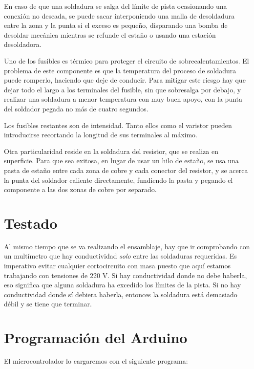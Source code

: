 En caso de que una soldadura se salga del límite de pista ocasionando una
conexión no deseada, se puede sacar interponiendo una malla de desoldadura
entre la zona y la punta si el exceso es pequeño, disparando una bomba de
desoldar mecánica mientras se refunde el estaño o usando una estación
desoldadora.

Uno de los fusibles es térmico para proteger el circuito de
sobrecalentamientos. El problema de este componente es que la temperatura del
proceso de soldadura puede romperlo, haciendo que deje de conducir. Para
mitigar este riesgo hay que dejar todo el largo a los terminales del fusible,
sin que sobresalga por debajo, y realizar una soldadura a menor temperatura con
muy buen apoyo, con la punta del soldador pegada no más de cuatro segundos.

Los fusibles restantes son de intensidad. Tanto ellos como el varistor pueden
introducirse recortando la longitud de sus terminales al máximo.

Otra particularidad reside en la soldadura del resistor, que se realiza en
superficie. Para que sea exitosa, en lugar de usar un hilo de estaño, se usa
una pasta de estaño entre cada zona de cobre y cada conector del resistor, y se
acerca la punta del soldador caliente directamente, fundiendo la pasta y
pegando el componente a las dos zonas de cobre por separado.

\section{Testado}

Al mismo tiempo que se va realizando el ensamblaje, hay que ir comprobando con
un multímetro que hay conductividad \emph{solo} entre las soldaduras
requeridas. Es imperativo evitar cualquier cortocircuito con masa puesto que
aquí estamos trabajando con tensiones de 220 V. Si hay conductividad donde no
debe haberla, eso significa que alguna soldadura ha excedido los límites de la
pista. Si no hay conductividad donde sí debiera haberla, entonces la soldadura
está demasiado débil y se tiene que terminar.

\section{Programación del Arduino}

El microcontrolador lo cargaremos con el siguiente programa:



